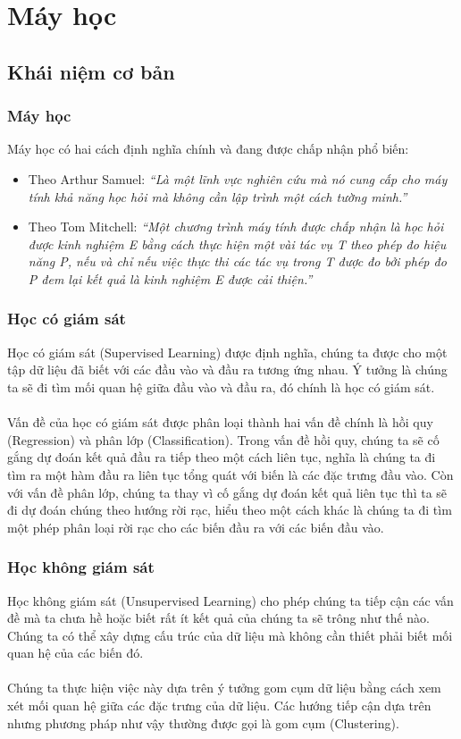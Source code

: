 \section{Máy học}
\subsection{Khái niệm cơ bản}
\subsubsection{Máy học}
Máy học có hai cách định nghĩa chính và đang được chấp nhận phổ biến:
\begin{itemize}
\item Theo Arthur Samuel: \textit{``Là một lĩnh vực nghiên cứu mà nó cung cấp 
cho máy tính khả năng học hỏi mà không cần lập trình một cách tường minh.''}
\item Theo Tom Mitchell: \textit{``Một chương trình máy tính được chấp nhận là 
học hỏi được kinh nghiệm E bằng cách thực hiện một vài tác vụ T theo phép đo hiệu
năng P, nếu và chỉ nếu việc thực thi các tác vụ trong T được đo bởi phép đo P
đem lại kết quả là kinh nghiệm E được cải thiện.''}
\end{itemize}
\subsubsection{Học có giám sát}
Học có giám sát (Supervised Learning) được định nghĩa, chúng ta được cho một 
tập dữ liệu đã biết với các đầu vào và đầu ra tương ứng nhau. Ý tưởng là chúng 
ta sẽ đi tìm mối quan hệ giữa đầu vào và đầu ra, đó chính là học có giám sát.\\\\
Vấn đề của học có giám sát được phân loại thành hai
vấn đề chính là hồi quy (Regression) và phân lớp (Classification). Trong vấn đề 
hồi quy, chúng ta sẽ cố gắng dự đoán kết quả đầu ra tiếp theo một cách liên tục, 
nghĩa là chúng ta đi tìm ra một hàm đầu ra liên tục tổng quát với biến là các 
đặc trưng đầu vào. Còn với vấn đề phân lớp, chúng ta thay vì cố gắng dự đoán kết
quả liên tục thì ta sẽ đi dự đoán chúng theo hướng rời rạc, hiểu theo một cách
khác là chúng ta đi tìm một phép phân loại rời rạc cho các biến đầu ra với các 
biến đầu vào.
\subsubsection{Học không giám sát}
Học không giám sát (Unsupervised Learning) cho phép chúng ta tiếp cận các vấn 
đề mà ta chưa hề hoặc biết rất ít kết quả của chúng ta sẽ trông như thế nào. 
Chúng ta có thể xây dựng cấu trúc của dữ liệu mà không cần thiết phải biết mối 
quan hệ của các biến đó.\\\\
Chúng ta thực hiện việc này dựa trên ý tưởng gom cụm dữ liệu bằng cách xem xét
mối quan hệ giữa các đặc trưng của dữ liệu. Các hướng tiếp cận dựa trên nhưng 
phương pháp như vậy thường được gọi là gom cụm (Clustering).
